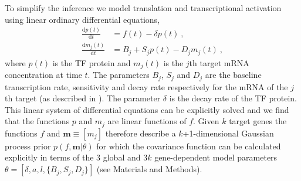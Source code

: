\documentclass{pnastwo}
\begin{document}
\begin{article}
To simplify the inference we model translation and transcriptional
activation %
using linear ordinary differential
equations,
\begin{align}
  \frac{\mathrm{d}p(t)}{\mathrm{d}t} & = f(t) - \delta
  p(t) \ , \label{eq:translation_ode} \\
  \frac{\mathrm{d}m_j(t)}{\mathrm{d}t} & = B_j+S_j p(t)-D_j m_j(t) \ , \label{eq:transcription_ode}
\end{align}
where $p(t)$ is the TF protein and $m_j(t)$ is the $j$th target mRNA
concentration at time $t$. The parameters $B_j$, $S_j$ and $D_j$ are the
baseline transcription rate, sensitivity and decay rate respectively
for the mRNA of the $j$th target (as described in \cite{Barenco2006a}).
The parameter $\delta$ is the decay rate of the TF protein.
This linear system of differential equations can be
explicitly solved and we find that the functions $p$ and $m_j$ are
linear functions of $f$. Given $k$ target genes the functions $f$ and $\bm m\equiv[m_j]$ therefore
describe a $k$+1-dimensional Gaussian process prior $p(f,\bm m|\theta)$
for which the covariance function can be calculated explicitly in terms of the
$3$ global and $3k$ gene-dependent model parameters
$\theta=[\delta,a,l,\{B_j,S_j,D_j\}]$ (see Materials and Methods). 


\end{article}
\end{document}
